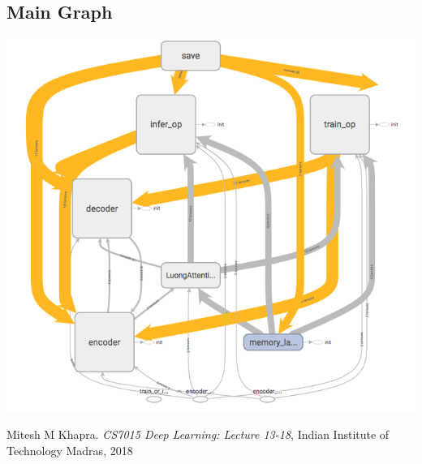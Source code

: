 \documentclass[12pt]{report}
\begin{document}
\subsection{Main Graph}
\begin{center}
\includegraphics[scale=0.7]{Main_graph.png}
\end{center}

\begin{thebibliography}{9}
Mitesh M Khapra. \textit{CS7015 Deep Learning: Lecture 13-18}, 
Indian Institute of Technology Madras, 2018
\end{thebibliography}
\end{document}

